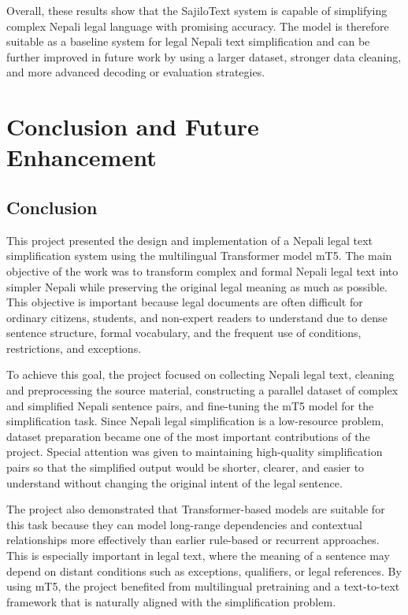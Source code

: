 \documentclass[12pt]{report}
\begin{document}
Overall, these results show that the SajiloText system is capable of simplifying complex Nepali legal language with promising accuracy. The model is therefore suitable as a baseline system for legal Nepali text simplification and can be further improved in future work by using a larger dataset, stronger data cleaning, and more advanced decoding or evaluation strategies.

\chapter{Conclusion and Future Enhancement}

\section{Conclusion}

This project presented the design and implementation of a Nepali legal text simplification system using the multilingual Transformer model mT5. The main objective of the work was to transform complex and formal Nepali legal text into simpler Nepali while preserving the original legal meaning as much as possible. This objective is important because legal documents are often difficult for ordinary citizens, students, and non-expert readers to understand due to dense sentence structure, formal vocabulary, and the frequent use of conditions, restrictions, and exceptions.

To achieve this goal, the project focused on collecting Nepali legal text, cleaning and preprocessing the source material, constructing a parallel dataset of complex and simplified Nepali sentence pairs, and fine-tuning the mT5 model for the simplification task. Since Nepali legal simplification is a low-resource problem, dataset preparation became one of the most important contributions of the project. Special attention was given to maintaining high-quality simplification pairs so that the simplified output would be shorter, clearer, and easier to understand without changing the original intent of the legal sentence.

The project also demonstrated that Transformer-based models are suitable for this task because they can model long-range dependencies and contextual relationships more effectively than earlier rule-based or recurrent approaches. This is especially important in legal text, where the meaning of a sentence may depend on distant conditions such as exceptions, qualifiers, or legal references. By using mT5, the project benefited from multilingual pretraining and a text-to-text framework that is naturally aligned with the simplification problem.
\end{document}
